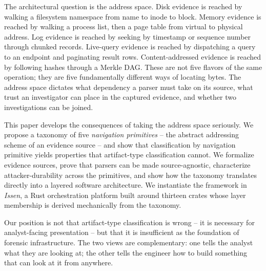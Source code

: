 The architectural question is the address space. Disk evidence is reached by
walking a filesystem namespace from name to inode to block. Memory evidence
is reached by walking a process list, then a page table from virtual to
physical address. Log evidence is reached by seeking by timestamp or
sequence number through chunked records. Live-query evidence is reached by
dispatching a query to an endpoint and paginating result rows.
Content-addressed evidence is reached by following hashes through a Merkle
DAG. These are not five flavors of the same operation; they are five
fundamentally different ways of locating bytes. The address space dictates
what dependency a parser must take on its source, what trust an investigator
can place in the captured evidence, and whether two investigations can be
joined.

This paper develops the consequences of taking the address space seriously.
We propose a taxonomy of five \emph{navigation primitives} -- the abstract
addressing scheme of an evidence source -- and show that classification by
navigation primitive yields properties that artifact-type classification
cannot. We formalize evidence sources, prove that parsers can be made
source-agnostic, characterize attacker-durability across the primitives, and
show how the taxonomy translates directly into a layered software
architecture. We instantiate the framework in \emph{Issen}, a Rust
orchestration platform built around thirteen crates whose layer membership
is derived mechanically from the taxonomy.

Our position is not that artifact-type classification is wrong -- it is
necessary for analyst-facing presentation -- but that it is insufficient as
the foundation of forensic infrastructure. The two views are complementary:
one tells the analyst what they are looking at; the other tells the engineer
how to build something that can look at it from anywhere.

